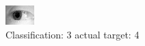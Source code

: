 \begin{figure}[h!]
\begin{center}
\includegraphics[width=0.60\columnwidth]{figures/ID1210_class_3_target_4.png}
\end{center}
\caption{ Classification: 3 actual target: 4}
\label{fig:ID1210_class_3_target_4}
\end{figure}
